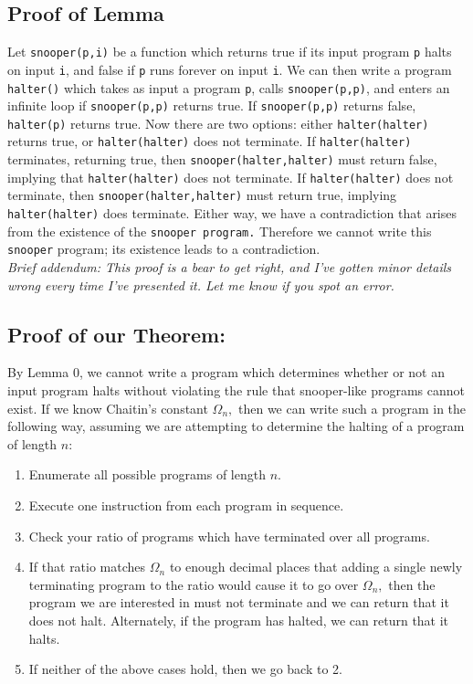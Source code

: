 \documentclass{article}
\begin{document}
\subsection{Proof of Lemma}
Let \texttt{snooper(p,i)} be a function which returns true if its input program \texttt{p} halts on input \texttt{i}, and false if \texttt{p} runs forever on input \texttt{i}. We can then write a program \texttt{halter()} which takes as input a program \texttt{p}, calls \texttt{snooper(p,p)}, and enters an infinite loop if \texttt{snooper(p,p)} returns true. If \texttt{snooper(p,p)} returns false, \texttt{halter(p)} returns true. Now there are two options: either \texttt{halter(halter)} returns true, or \texttt{halter(halter)} does not terminate. If \texttt{halter(halter)} terminates, returning true, then \texttt{snooper(halter,halter)} must return false, implying that \texttt{halter(halter)} does not terminate. If \texttt{halter(halter)} does not terminate, then \texttt{snooper(halter,halter)} must return true, implying \texttt{halter(halter)} does terminate. Either way, we have a contradiction that arises from the existence of the \texttt{snooper program.} Therefore we cannot write this \texttt{snooper} program; its existence leads to a contradiction.\\

\textit{Brief addendum: This proof is a bear to get right, and I've gotten minor details wrong every time I've presented it. Let me know if you spot an error.}\\

\subsection{Proof of our Theorem:}
By Lemma 0, we cannot write a program which determines whether or not an input program halts without violating the rule that snooper-like programs cannot exist. If we know Chaitin's constant $\Omega_n,$ then we can write such a program in the following way, assuming we are attempting to determine the halting of a program of length $n:$\\

\begin{enumerate}[1.]
\item Enumerate all possible programs of length $n.$
\item Execute one instruction from each program in sequence.
\item Check your ratio of programs which have terminated over all programs.
\item If that ratio matches $\Omega_n$ to enough decimal places that adding a single newly terminating program to the ratio would cause it to go over $\Omega_n,$ then the program we are interested in must not terminate and we can return that it does not halt. Alternately, if the program has halted, we can return that it halts.
\item If neither of the above cases hold, then we go back to 2.
\end{enumerate}
\end{document}
